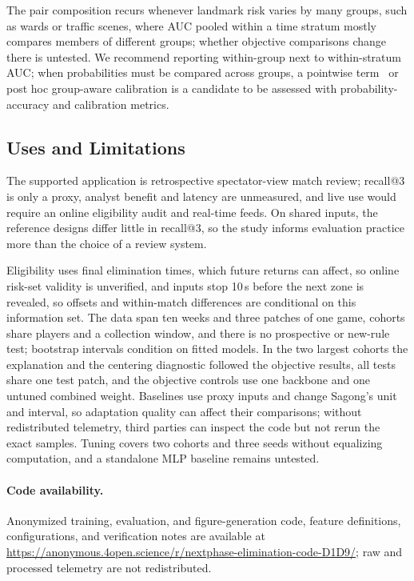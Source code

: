 \documentclass[sigconf,anonymous,nonacm]{acmart}
\newcommand{\artifacturl}{\url{https://anonymous.4open.science/r/nextphase-elimination-code-D1D9/}}
\begin{document}
The pair composition recurs whenever landmark risk varies by many groups, such as wards or traffic scenes, where AUC pooled within a time stratum mostly compares members of different groups; whether objective comparisons change there is untested. We recommend reporting within-group next to within-stratum AUC; when probabilities must be compared across groups, a pointwise term~\cite{Bai23} or post hoc group-aware calibration is a candidate to be assessed with probability-accuracy and calibration metrics.

\subsection{Uses and Limitations}
\label{sec:discussion:limits}
The supported application is retrospective spectator-view match review; recall@3 is only a proxy, analyst benefit and latency are unmeasured, and live use would require an online eligibility audit and real-time feeds. On shared inputs, the reference designs differ little in recall@3, so the study informs evaluation practice more than the choice of a review system.

Eligibility uses final elimination times, which future returns can affect, so online risk-set validity is unverified, and inputs stop 10\,s before the next zone is revealed, so offsets and within-match differences are conditional on this information set. The data span ten weeks and three patches of one game, cohorts share players and a collection window, and there is no prospective or new-rule test; bootstrap intervals condition on fitted models. In the two largest cohorts the explanation and the centering diagnostic followed the objective results, all tests share one test patch, and the objective controls use one backbone and one untuned combined weight. Baselines use proxy inputs and change Sagong's unit and interval, so adaptation quality can affect their comparisons; without redistributed telemetry, third parties can inspect the code but not rerun the exact samples. Tuning covers two cohorts and three seeds without equalizing computation, and a standalone MLP baseline remains untested.

\paragraph{Code availability.}
Anonymized training, evaluation, and figure-generation code, feature definitions, configurations, and verification notes are available at \artifacturl{}; raw and processed telemetry are not redistributed.
\end{document}
